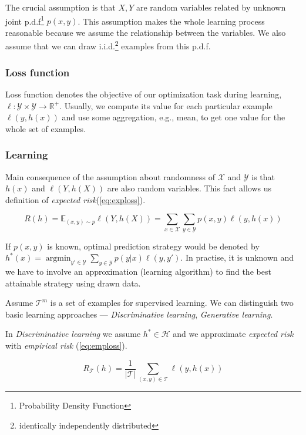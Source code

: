 The crucial assumption is that $X, Y$ are random variables related by unknown joint p.d.f\footnote{Probability Density Function} $p(x,y)$. This assumption makes the whole learning process reasonable because we assume the relationship between the variables. We also assume that we can draw i.i.d.\footnote{identically independently distributed} examples from this p.d.f.

\subsubsection*{Loss function}
Loss function denotes the objective of our optimization task during learning, $\ell: \mathcal{Y} \times \mathcal{Y} \rightarrow \mathbb{R}^{+}$. Usually, we compute its value for each particular example $\ell(y, h(x))$ and use some aggregation, e.g., mean, to get one value for the whole set of examples.

\subsubsection*{Learning}
Main consequence of the assumption about randomness of $\mathcal{X}$ and $\mathcal{Y}$ is that $h(x)$ and $\ell(Y,h(X))$ are also random variables. This fact allows us definition of \emph{expected risk}(\eqref{eq:exploss}).

\begin{equation} \label{eq:exploss}
    R(h)=\mathbb{E}_{(x,y) \sim p}\ell(Y,h(X))=\sum_{x \in \mathcal{X}}\sum_{y \in \mathcal{Y}}p(x,y)\ell(y,h(x))
\end{equation}

If $p(x,y)$ is known, optimal prediction strategy would be denoted by $h^*(x)=\operatorname*{argmin}_{{y}'\in \mathcal{Y}}\sum_{y\in\mathcal{Y}}p(y|x)\ell(y,{y}')$. In practise, it is unknown and we have to involve an approximation (learning algorithm) to find the best attainable strategy using drawn data.

Assume $\mathcal{T}^m$ is a set of examples for supervised learning. We can distinguish two basic learning approaches --- \emph{Discriminative learning}, \emph{Generative learning}.

In \emph{Discriminative learning} we assume $h^* \in \mathcal{H}$ and we approximate \emph{expected risk} with \emph{empirical risk} (\eqref{eq:emploss}).

\begin{equation} \label{eq:emploss}
    R_{\mathcal{T}}(h)= \frac{1}{|\mathcal{T}|} \sum_{(x,y) \in \mathcal
    T}\ell(y,h(x))
\end{equation}


